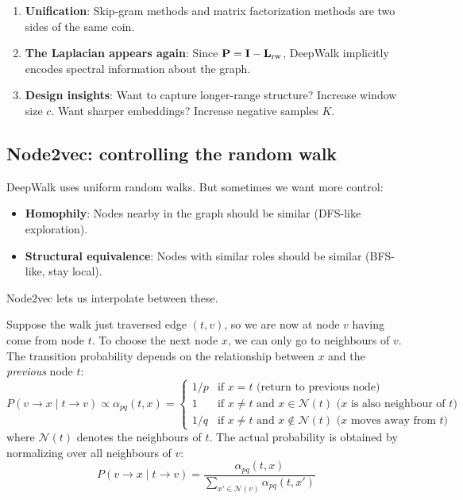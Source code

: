 \begin{notechapter}
\begin{keyidea}
\begin{enumerate}
    \item \textbf{Unification}: Skip-gram methods and matrix factorization methods are two sides of the same coin.
    \item \textbf{The Laplacian appears again}: Since $\mathbf{P} = \mathbf{I} - \mathbf{L}_{\text{rw}}$, DeepWalk implicitly encodes spectral information about the graph.
    \item \textbf{Design insights}: Want to capture longer-range structure? Increase window size $c$. Want sharper embeddings? Increase negative samples $K$.
\end{enumerate}
\end{keyidea}

\subsection{Node2vec: controlling the random walk}

\begin{intuition}[Motivation]
DeepWalk uses uniform random walks. But sometimes we want more control:
\begin{itemize}
    \item \textbf{Homophily}: Nodes nearby in the graph should be similar (DFS-like exploration).
    \item \textbf{Structural equivalence}: Nodes with similar roles should be similar (BFS-like, stay local).
\end{itemize}
Node2vec lets us interpolate between these.
\end{intuition}

\begin{definition}
Suppose the walk just traversed edge $(t, v)$, so we are now at node $v$ having come from node $t$. To choose the next node $x$, we can only go to neighbours of $v$. The transition probability depends on the relationship between $x$ and the \emph{previous} node $t$:
\[
P(v \to x \mid t \to v) \propto \alpha_{pq}(t, x) = \begin{cases}
    1/p & \text{if } x = t \text{ (return to previous node)} \\
    1 & \text{if } x \neq t \text{ and } x \in \mathcal{N}(t) \text{ (}x\text{ is also neighbour of }t\text{)} \\
    1/q & \text{if } x \neq t \text{ and } x \notin \mathcal{N}(t) \text{ (}x\text{ moves away from }t\text{)}
\end{cases}
\]
where $\mathcal{N}(t)$ denotes the neighbours of $t$. The actual probability is obtained by normalizing over all neighbours of $v$:
\[
P(v \to x \mid t \to v) = \frac{\alpha_{pq}(t,x)}{\sum_{x' \in \mathcal{N}(v)} \alpha_{pq}(t, x')}
\]
\end{definition}


\end{notechapter}

